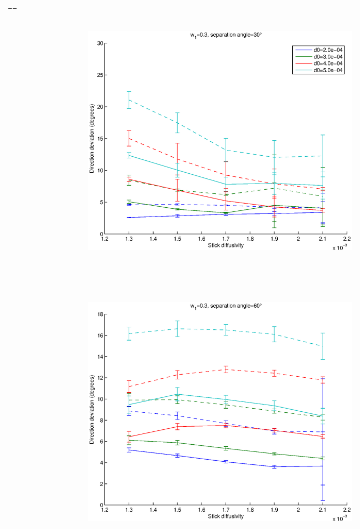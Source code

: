 \documentclass{article}
\begin{document}
\begin{figure}[H]
  \begin{adjustwidth}{-\oddsidemargin}{-\rightmargin}
    \begin{subfigure}{0.8\paperwidth}
      \begin{subfigure}{0.3\textwidth}
        \centering
        \includegraphics[width=\textwidth]{figures/synth_modbas_weights_diffus__snr=20__w1=3__angle=30.eps}
      \end{subfigure}
      ~
      \begin{subfigure}{0.3\textwidth}
        \centering
        \includegraphics[width=\textwidth]{figures/synth_modbas_weights_diffus__snr=20__w1=3__angle=60.eps}

\end{subfigure}
\end{subfigure}
\end{adjustwidth}
\end{figure}
\end{document}
